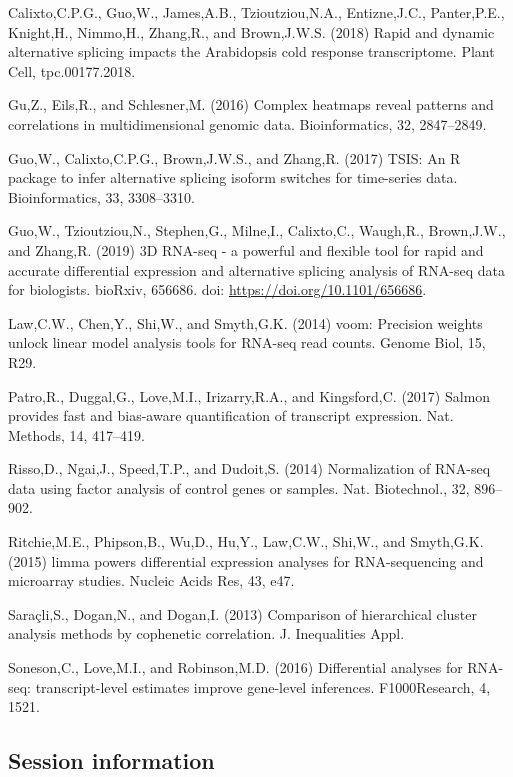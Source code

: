 \documentclass[]{article}
\begin{document}
Calixto,C.P.G., Guo,W., James,A.B., Tzioutziou,N.A., Entizne,J.C.,
Panter,P.E., Knight,H., Nimmo,H., Zhang,R., and Brown,J.W.S. (2018)
Rapid and dynamic alternative splicing impacts the Arabidopsis cold
response transcriptome. Plant Cell, tpc.00177.2018.

Gu,Z., Eils,R., and Schlesner,M. (2016) Complex heatmaps reveal patterns
and correlations in multidimensional genomic data. Bioinformatics, 32,
2847--2849.

Guo,W., Calixto,C.P.G., Brown,J.W.S., and Zhang,R. (2017) TSIS: An R
package to infer alternative splicing isoform switches for time-series
data. Bioinformatics, 33, 3308--3310.

Guo,W., Tzioutziou,N., Stephen,G., Milne,I., Calixto,C., Waugh,R.,
Brown,J.W., and Zhang,R. (2019) 3D RNA-seq - a powerful and flexible
tool for rapid and accurate differential expression and alternative
splicing analysis of RNA-seq data for biologists. bioRxiv, 656686. doi:
\url{https://doi.org/10.1101/656686}.

Law,C.W., Chen,Y., Shi,W., and Smyth,G.K. (2014) voom: Precision weights
unlock linear model analysis tools for RNA-seq read counts. Genome Biol,
15, R29.

Patro,R., Duggal,G., Love,M.I., Irizarry,R.A., and Kingsford,C. (2017)
Salmon provides fast and bias-aware quantification of transcript
expression. Nat. Methods, 14, 417--419.

Risso,D., Ngai,J., Speed,T.P., and Dudoit,S. (2014) Normalization of
RNA-seq data using factor analysis of control genes or samples. Nat.
Biotechnol., 32, 896--902.

Ritchie,M.E., Phipson,B., Wu,D., Hu,Y., Law,C.W., Shi,W., and Smyth,G.K.
(2015) limma powers differential expression analyses for RNA-sequencing
and microarray studies. Nucleic Acids Res, 43, e47.

Saraçli,S., Dogan,N., and Dogan,I. (2013) Comparison of hierarchical
cluster analysis methods by cophenetic correlation. J. Inequalities
Appl.

Soneson,C., Love,M.I., and Robinson,M.D. (2016) Differential analyses
for RNA-seq: transcript-level estimates improve gene-level inferences.
F1000Research, 4, 1521.

\subsection{Session information}\label{session-information}
\end{document}
